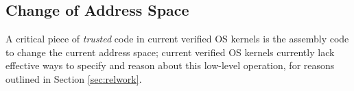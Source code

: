 

\subsection{Change of Address Space}
A critical piece of \emph{trusted} code in current verified OS kernels is the assembly code to change the current address space; current verified OS kernels currently 
lack effective ways to specify and reason about this low-level operation, for reasons outlined in Section \ref{sec:relwork}.
